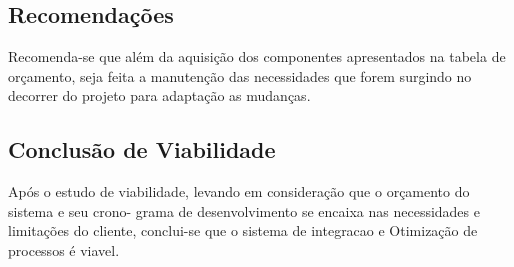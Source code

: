 \subsection{Recomenda\c{c}\~{o}es}
Recomenda-se que além da aquisição dos componentes
apresentados na tabela de orçamento, seja
feita a manutenção das necessidades que
forem surgindo no decorrer do projeto para adaptação as
mudanças.

\subsection{Conclus\~{a}o de Viabilidade}
Após o estudo de viabilidade, levando em consideração
que o orçamento do sistema e seu crono-
grama de desenvolvimento se encaixa nas
necessidades e limitações do cliente, conclui-se que o
sistema de integracao e Otimização de processos é 
viavel.

